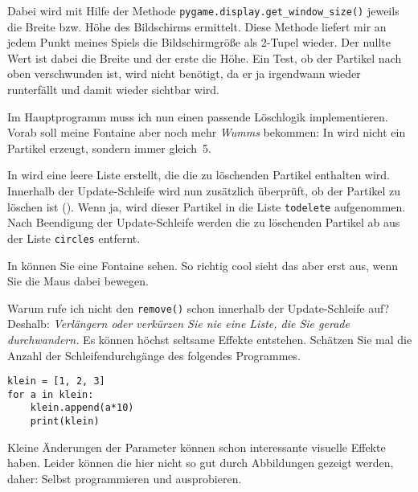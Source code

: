 Dabei wird mit Hilfe der Methode \texttt{pygame.display.get\_window\_size()} jeweils die Breite bzw. Höhe des Bildschirms ermittelt. Diese Methode liefert mir an jedem Punkt meines Spiels die Bildschirmgröße als 2-Tupel wieder. Der nullte Wert ist dabei die Breite und der erste die Höhe. Ein Test, ob der Partikel nach oben verschwunden ist, wird nicht benötigt, da er ja irgendwann wieder runterfällt und damit wieder sichtbar wird.

\newpage
{}

Im Hauptprogramm muss ich nun einen passende Löschlogik implementieren. Vorab soll meine Fontaine aber noch mehr \emph{Wumms} bekommen: In  wird nicht ein Partikel erzeugt, sondern immer gleich~5.

In  wird eine leere Liste erstellt, die die zu löschenden Partikel enthalten wird. Innerhalb der Update-Schleife wird nun zusätzlich überprüft, ob der Partikel zu löschen ist (). Wenn ja, wird dieser Partikel in die Liste \texttt{todelete} aufgenommen. Nach Beendigung der Update-Schleife werden die zu löschenden Partikel ab  aus der Liste \texttt{circles} entfernt.

In  können Sie eine Fontaine sehen. So richtig cool sieht das aber erst aus, wenn Sie die Maus dabei bewegen.


Warum rufe ich nicht den \texttt{remove()} schon innerhalb der Update-Schleife auf? Deshalb: \emph{Verlängern oder verkürzen Sie nie eine Liste, die Sie gerade durchwandern.} Es können höchst seltsame Effekte entstehen. Schätzen Sie mal die Anzahl der Schleifendurchgänge des folgendes Programmes.

\begin{lstlisting}[firstnumber=1]
klein = [1, 2, 3]
for a in klein:
    klein.append(a*10)
    print(klein)	
\end{lstlisting}

Kleine Änderungen der Parameter können schon interessante visuelle Effekte haben. Leider können die hier nicht so gut durch Abbildungen gezeigt werden, daher: Selbst programmieren und ausprobieren.


